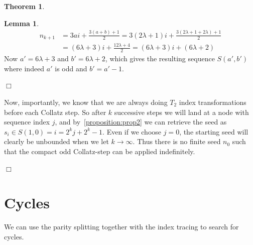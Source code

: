 \documentclass{article}
\theoremstyle{definition}
\newtheorem{theorem}{Theorem}[section]
\newtheorem{lemma}{Lemma}[section]
\begin{document}
\begin{theorem}
\begin{lemma}
\begin{equation*}
\begin{split}
    n_{k+1} &= 3ai + \frac{3(a+b)+1}{2} = 3(2\lambda+1)i + \frac{3(2\lambda+1+2\lambda)+1}{2}\\
    &= (6\lambda+3)i + \frac{12\lambda+4}{2} = (6\lambda+3)i + (6\lambda+2)
\end{split}
\end{equation*}
Now $a'=6\lambda+3$ and $b'=6\lambda+2$, which gives the resulting sequence $S(a',b')$ where indeed $a'$ is odd and $b'=a'-1$.
\end{lemma}
\begin{flushright}
$\Box$
\end{flushright}
Now, importantly, we know that we are always doing $T_2$ index transformations before each Collatz step. So after $k$ successive steps we will land at a node with sequence index $j$, and by~\ref{proposition:prop2} we can retrieve the seed as $s_i\in S(1,0) = i = 2^kj + 2^k -1$. Even if we choose $j=0$, the starting seed will clearly be unbounded when we let $k\longrightarrow\infty$. Thus there is no finite seed $n_0$ such that the compact odd Collatz-step can be applied indefinitely.
\begin{flushright}
$\Box$
\end{flushright}
\end{theorem}

\section{Cycles}\label{sec:cycles}
We can use the parity splitting together with the index tracing to search for cycles.
\end{document}
